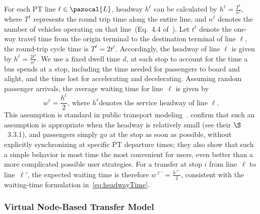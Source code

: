 \documentclass[a4paper,fleqn]{cas-sc}
\begin{document}
For each PT line $\ell \in \pazocal{L}$, headway $h^\ell$ can be calculated by $h^\ell = \frac{T^\ell}{n^\ell}$, where $T^\ell$ represents the round trip time along the entire line, and $n^\ell$ denotes the number of vehicles operating on that line~(Eq.~4.4 of~\citep{vuchic1981timed}).  
Let $t^\ell$ denote the one-way travel time from the origin terminal to the destination terminal of line $\ell$, the round-trip cycle time is $T^\ell = 2t^\ell$.
Accordingly, the headway of line $\ell$ is given by
$h^\ell = \frac{2t^\ell}{n^\ell}$.
%
We use a fixed dwell time $d$, at each stop to account for the time a bus spends at a stop, including the time needed for passengers to board and alight, and the time lost for accelerating and decelerating.
%
Assuming random passenger arrivals, the average waiting time for line~$\ell$ is given by
\begin{equation}
    w^\ell = \frac{h^\ell}{2}\text{, where }h^\ell \text{denotes the service headway of line~}\ell.
    \label{eq:headwayTime}
\end{equation}
This assumption is standard in public transport modeling~\citep{parbo2018reducing, zhang2018service}. 
\cite{liu2020does} confirm that such an assumption is appropriate when the headway is relatively small (see their $\S$~3.3.1), and passengers simply go at the stop as soon as possible, without explicitly synchronizing at specific PT departure times; they also show that such a simple behavior is most time the most convenient for users, even better than a more complicated possible user strategies.
%
For a transfer at stop $i$ from line~$\ell$ to line~$\ell'$, the expected waiting time is therefore
$w^{\ell'} = \frac{h^{\ell'}}{2}$, 
consistent with the waiting-time formulation in~\eqref{eq:headwayTime}.

\subsubsection{Virtual Node-Based Transfer Model}\label{sec:virtual_nodes}
\end{document}
